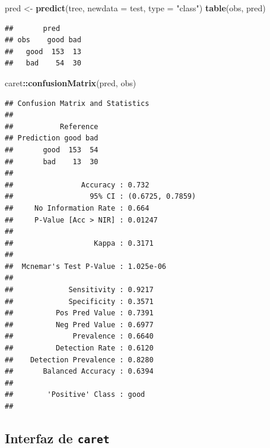 \documentclass[
  spanish,
]{book}
\newenvironment{Shaded}{\begin{snugshade}}{\end{snugshade}}
\newcommand{\DataTypeTok}[1]{\textcolor[rgb]{0.13,0.29,0.53}{#1}}
\newcommand{\KeywordTok}[1]{\textcolor[rgb]{0.13,0.29,0.53}{\textbf{#1}}}
\newcommand{\NormalTok}[1]{#1}
\newcommand{\OperatorTok}[1]{\textcolor[rgb]{0.81,0.36,0.00}{\textbf{#1}}}
\newcommand{\StringTok}[1]{\textcolor[rgb]{0.31,0.60,0.02}{#1}}
\theoremstyle{break}
\theoremstyle{definition}
\theoremstyle{definition}
\theoremstyle{definition}
\theoremstyle{remark}
\begin{document}
\begin{Shaded}
\begin{Highlighting}[]
\NormalTok{pred <-}\StringTok{ }\KeywordTok{predict}\NormalTok{(tree, }\DataTypeTok{newdata =}\NormalTok{ test, }\DataTypeTok{type =} \StringTok{"class"}\NormalTok{)}
\KeywordTok{table}\NormalTok{(obs, pred)}
\end{Highlighting}
\end{Shaded}

\begin{verbatim}
##       pred
## obs    good bad
##   good  153  13
##   bad    54  30
\end{verbatim}

\begin{Shaded}
\begin{Highlighting}[]
\NormalTok{caret}\OperatorTok{::}\KeywordTok{confusionMatrix}\NormalTok{(pred, obs)}
\end{Highlighting}
\end{Shaded}

\begin{verbatim}
## Confusion Matrix and Statistics
## 
##           Reference
## Prediction good bad
##       good  153  54
##       bad    13  30
##                                           
##                Accuracy : 0.732           
##                  95% CI : (0.6725, 0.7859)
##     No Information Rate : 0.664           
##     P-Value [Acc > NIR] : 0.01247         
##                                           
##                   Kappa : 0.3171          
##                                           
##  Mcnemar's Test P-Value : 1.025e-06       
##                                           
##             Sensitivity : 0.9217          
##             Specificity : 0.3571          
##          Pos Pred Value : 0.7391          
##          Neg Pred Value : 0.6977          
##              Prevalence : 0.6640          
##          Detection Rate : 0.6120          
##    Detection Prevalence : 0.8280          
##       Balanced Accuracy : 0.6394          
##                                           
##        'Positive' Class : good            
## 
\end{verbatim}

\hypertarget{interfaz-de-caret}{%
\subsection{\texorpdfstring{Interfaz de \texttt{caret}}{Interfaz de caret}}\label{interfaz-de-caret}}
\end{document}

